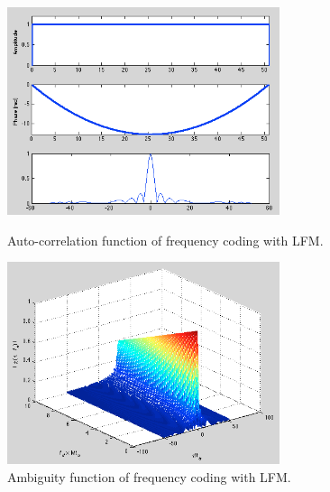 \documentclass{article}
\begin{document}
\begin{figure}[tbh]
\begin{minipage}[t]{0.5\linewidth}
\centering
\includegraphics[width=8cm]{Figures/lfm_data.png}
\caption{Auto-correlation function of frequency coding with LFM.}
\label{fig:lfm_data}
\end{minipage}
\begin{minipage}[t]{0.5\linewidth}
\centering
\includegraphics[width=8cm]{Figures/lfm_3d.png}
\caption{Ambiguity function of frequency coding with LFM.}
\label{fig:lfm_3d}
\end{minipage}
\end{figure}
\end{document}
